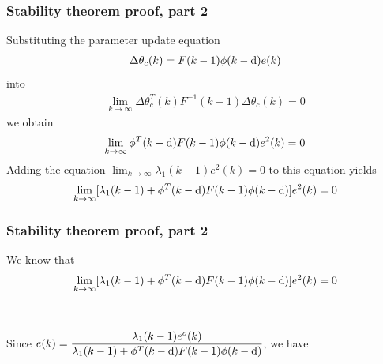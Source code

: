 \begin{frame}
    \frametitle{Stability theorem proof, part 2}

    Substituting the parameter update equation
    \begin{align*}
        \Delta \theta_c(k) = F(k-1) \phi(k-\textrm{d}) e(k)
    \end{align*}
    into
    \begin{align*}
        \lim_{k \rightarrow \infty} \Delta \theta_c^T(k) F^{-1}(k-1) \Delta \theta_c(k) = 0
    \end{align*}
    we obtain
    \begin{align*}
        \lim_{k \rightarrow \infty} \phi^T(k-\textrm{d}) F(k-1) \phi(k-\textrm{d}) e^2(k) = 0
    \end{align*}
    \pause
    Adding the equation $\displaystyle \lim_{k\rightarrow \infty} \lambda_1(k-1) e^2(k) = 0$ to this equation yields
    \begin{align*}
        \lim_{k \rightarrow \infty} [\lambda_1(k-1) + \phi^T(k-\textrm{d}) F(k-1) \phi(k-\textrm{d})] e^2(k) = 0
    \end{align*}

\end{frame}

\begin{frame}
    \frametitle{Stability theorem proof, part 2}

    We know that
    \begin{align*}
        \lim_{k \rightarrow \infty} [\lambda_1(k-1) + \phi^T(k-\textrm{d}) F(k-1) \phi(k-\textrm{d})] e^2(k) = 0
    \end{align*}

    $ \ $

    Since $\displaystyle e(k) = \frac{ \lambda_1(k-1) e^o(k) }{ \lambda_1(k-1) + \phi^T(k-\textrm{d}) F(k-1) \phi(k-\textrm{d}) } $, we have

    $ \ $


\end{frame}


